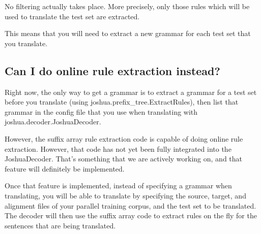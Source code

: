 No filtering actually takes place. More precisely, only those rules which will be used to translate the test set are extracted.

This means that you will need to extract a new grammar for each test set that you translate.


\subsection{Can I do online rule extraction instead?}

Right now, the only way to get a grammar is to extract a grammar for a test set before you translate (using joshua.prefix\_tree.ExtractRules), then list that grammar in the config file that you use when translating with joshua.decoder.JoshuaDecoder.

However, the suffix array rule extraction code is capable of doing online rule extraction. However, that code has not yet been fully integrated into the JoshuaDecoder. That's something that we are actively working on, and that feature will definitely be implemented.

Once that feature is implemented, instead of specifying a grammar when translating, you will be able to translate by specifying the source, target, and alignment files of your parallel training corpus, and the test set to be translated. The decoder will then use the suffix array code to extract rules on the fly for the sentences that are being translated.

